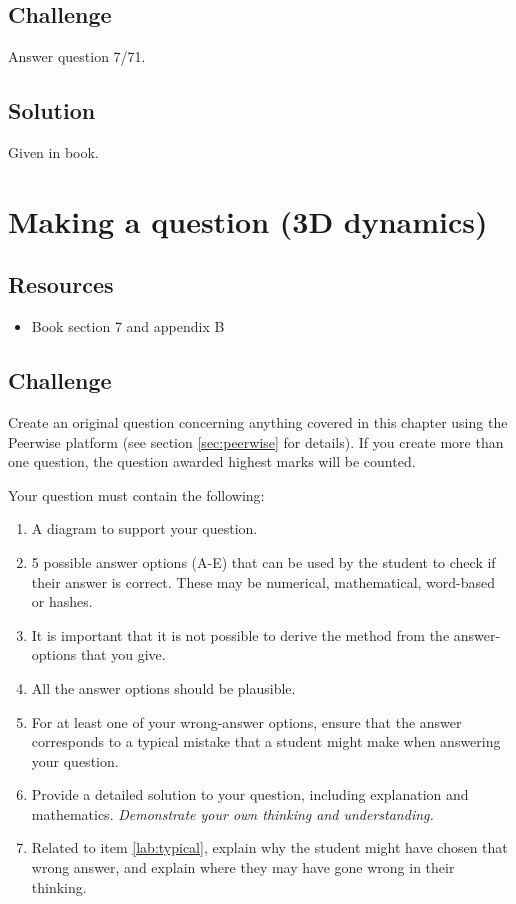 \subsection*{Challenge}
Answer question 7/71.

\subsection*{Solution}
Given in book.




\newpage
\section{Making a question (3D dynamics)}


\subsection*{Resources}
\begin{itemize}
    \item Book section 7 and appendix B
\end{itemize}

\subsection*{Challenge}
Create an original question concerning anything covered in this chapter using the Peerwise platform (see section \ref{sec:peerwise} for details). If you create more than one question, the question awarded highest marks will be counted.

Your question must contain the following:
\begin{enumerate}
    \item A diagram to support your question.
    \item 5 possible answer options (A-E) that can be used by the student to check if their answer is correct. These may be numerical, mathematical, word-based or hashes.
    \item It is important that it is not possible to derive the method from the answer-options that you give.
    \item All the answer options should be plausible.
    \item For at least one of your wrong-answer options, ensure that the answer corresponds to a typical mistake that a student might make when answering your question. \label{lab:typical}
    \item Provide a detailed solution to your question, including explanation and mathematics. \emph{Demonstrate your own thinking and understanding.}
    \item Related to item \ref{lab:typical}, explain why the student might have chosen that wrong answer, and explain where they may have gone wrong in their thinking.
\end{enumerate}




